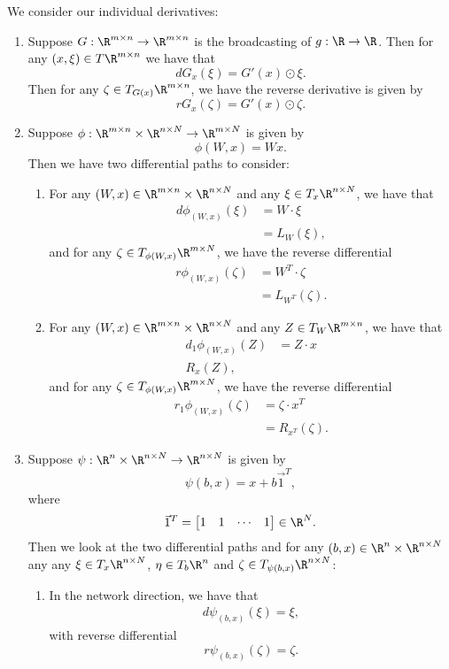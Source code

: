 We consider our individual derivatives:
\begin{enumerate}
	\item Suppose $G:\R^{m\times n}\to\R^{m\times n}$ is the broadcasting of $g:\R\to\R$.  Then for any $(x,\xi)\in T\R^{m\times n}$ we have that
	$$dG_x(\xi)=G'(x)\odot\xi.$$
	Then for any $\zeta\in T_{G(x)}\R^{m\times n}$, we have the reverse derivative is given by
	$$rG_x(\zeta)=G'(x)\odot\zeta.$$
	
	\item Suppose $\phi:\R^{m\times n}\times\R^{n\times N}\to\R^{m\times N}$ is given by
	$$\phi(W,x)=Wx.$$
	Then we have two differential paths to consider:
	\begin{enumerate}
		\item For any $(W,x)\in \R^{m\times n}\times \R^{n\times N}$ and any $\xi\in T_x\R^{n\times N}$, we have that
		\begin{align*}
			d\phi_{(W,x)}(\xi)&=W\cdot\xi\\
			&=L_W(\xi),
		\end{align*}
		and for any $\zeta\in T_{\phi(W,x)}\R^{m\times N}$, we have the reverse differential
		\begin{align*}
			r\phi_{(W,x)}(\zeta)&=W^T\cdot\zeta\\
			&=L_{W^T}(\zeta).
		\end{align*}
		
		\item For any $(W,x)\in\R^{m\times n}\times \R^{n\times N}$ and any $Z\in T_W\R^{m\times n}$, we have that
		\begin{align*}
			d_1\phi_{(W,x)}(Z)&=Z\cdot x\\
			R_x(Z),
		\end{align*}
		and for any $\zeta\in T_{\phi(W,x)}\R^{m\times N}$, we have the reverse differential
		\begin{align*}
			r_1\phi_{(W,x)}(\zeta)&=\zeta\cdot x^T\\
			&=R_{x^T}(\zeta).
		\end{align*}
	\end{enumerate}
	
	\item Suppose $\psi:\R^n\times\R^{n\times N}\to\R^{n\times N}$ is given by
	$$\psi(b,x)=x+b\vec{1}^T,$$
	where
	$$\vec{1}^T=\begin{bmatrix}
		1&1&\cdots&1
	\end{bmatrix}\in\R^N.$$
	Then we look at the two differential paths and for any $(b,x)\in\R^n\times\R^{n\times N}$ any any $\xi\in T_x\R^{n\times N}$, $\eta\in T_b\R^n$ and $\zeta\in T_{\psi(b,x)}\R^{n\times N}$:
	\begin{enumerate}
		\item In the network direction, we have that
		\begin{align*}
			d\psi_{(b,x)}(\xi)=\xi,
		\end{align*}
		with reverse differential
		$$r\psi_{(b,x)}(\zeta)=\zeta.$$
		

\end{enumerate}
\end{enumerate}
